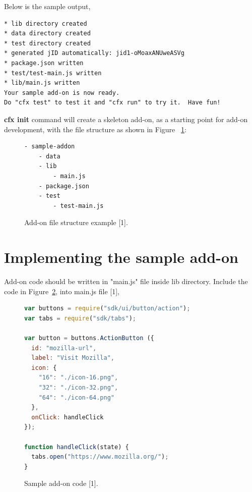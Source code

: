Below is the sample output,

\begin{lstlisting}[basicstyle=\linespread{0.2},frame=none,numbers=none,mathescape=false,upquote=true,keywordstyle=\color{black},stringstyle=\color{black}]
* lib directory created
* data directory created
* test directory created
* generated jID automatically: jid1-oMoaxANUweASVg
* package.json written
* test/test-main.js written
* lib/main.js written
Your sample add-on is now ready.
Do "cfx test" to test it and "cfx run" to try it.  Have fun!
\end{lstlisting}


\textbf{cfx init} command will create a skeleton add-on, as a starting point for add-on development, with the file structure as shown in Figure ~\ref{fig:filestructure}:
\begin{figure}[h]
  \centering
\begin{lstlisting}[frame=single,numbers=none,mathescape=false]
- sample-addon
	- data
	- lib
		- main.js
	- package.json
	- test
		- test-main.js
\end{lstlisting}
    \caption[Add-on file structure]{Add-on file structure example [1].}
    \label{fig:filestructure}
\end{figure}
\section{Implementing the sample add-on}

Add-on code should be written in "main.js" file inside lib directory. Include the code in Figure~\ref{fig:sampleaddon}, into main.js file [1],

\begin{figure}[h]
  \centering
\begin{lstlisting}[language=JavaScript]
var buttons = require("sdk/ui/button/action");
var tabs = require("sdk/tabs");

var button = buttons.ActionButton ({
  id: "mozilla-url",
  label: "Visit Mozilla",
  icon: {
    "16": "./icon-16.png",
    "32": "./icon-32.png",
    "64": "./icon-64.png"
  },
  onClick: handleClick
});

function handleClick(state) {
  tabs.open("https://www.mozilla.org/");
}
\end{lstlisting}
    \caption[Sample add-on code]{Sample add-on code [1].}
    \label{fig:sampleaddon}
\end{figure}

